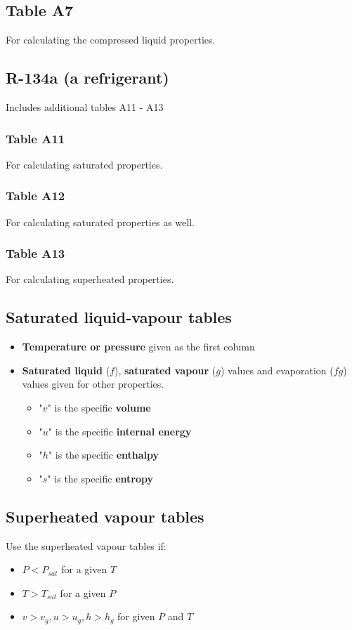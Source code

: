 \documentclass[11pt]{article}
\begin{document}
\subsection{Table A7}
\label{sec:org7832869}
For calculating the compressed liquid properties.
\subsection{R-134a (a refrigerant)}
\label{sec:org58b57c6}
Includes additional tables A11 - A13
\subsubsection{Table A11}
\label{sec:orgbcbf367}
For calculating saturated properties.
\subsubsection{Table A12}
\label{sec:org7d0f003}
For calculating saturated properties as well.
\subsubsection{Table A13}
\label{sec:org85d4cf8}
For calculating superheated properties.
\subsection{Saturated liquid-vapour tables}
\label{sec:org2bcb4c3}
\begin{itemize}
\item \textbf{Temperature or pressure} given as the first column
\item \textbf{Saturated liquid} (\(f\)), \textbf{saturated vapour} (\(g\)) values and evaporation (\(fg\)) values given for other properties.
\begin{itemize}
\item "\(v\)" is the specific \textbf{volume}
\item "\(u\)" is the specific \textbf{internal energy}
\item "\(h\)" is the specific \textbf{enthalpy}
\item "\(s\)" is the specific \textbf{entropy}
\end{itemize}
\end{itemize}
\subsection{Superheated vapour tables}
\label{sec:org65678b4}
Use the superheated vapour tables if:
\begin{itemize}
\item \(P < P_{sat}\) for a given \(T\)
\item \(T > T_{sat}\) for a given \(P\)
\item \(v > v_g, u > u_g, h > h_g\) for given \(P\) and \(T\)
\end{itemize}
\end{document}
